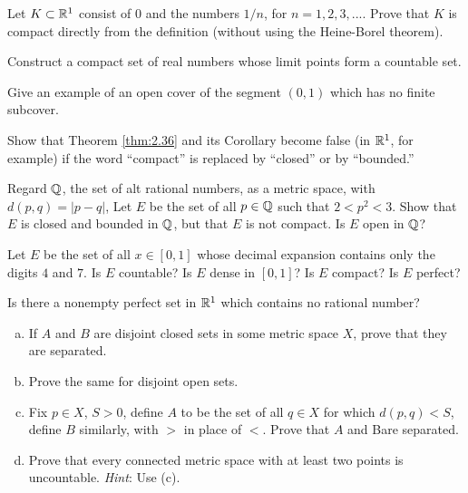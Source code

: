 \begin{myExercise}
    \label{ex:2.12}
    Let $K \subset {\protect\mathbb R}^1$ consist of $0$ and the numbers $1/n$, 
    for $n = 1, 2, 3, ...$. 
    Prove that $K$ is compact directly from the definition 
    (without using the Heine-Borel theorem).
\end{myExercise}

\begin{myExercise}
    \label{ex:2.13}
    Construct a compact set of real numbers whose limit points form a countable set.
\end{myExercise}

\begin{myExercise}
    \label{ex:2.14}
    Give an example of an open cover of the segment $(0, 1)$ 
    which has no finite subcover.
\end{myExercise}

\begin{myExercise}
    \label{ex:2.15}
    Show that Theorem \ref{thm:2.36} and its Corollary become false 
    (in ${\protect\mathbb R}^1$, for example) 
    if the word ``compact'' is replaced by ``closed'' or by ``bounded.''
\end{myExercise}

\begin{myExercise}
    \label{ex:2.16}
    Regard ${\protect\mathbb Q}$, the set of alt rational numbers, as a metric space, 
    with $d(p, q) = |p - q|$,
    Let $E$ be the set of all $p \in {\protect\mathbb Q}$ such that $2 < p^2 < 3$. 
    Show that $E$ is closed and bounded in ${\protect\mathbb Q}$, 
    but that $E$ is not compact. 
    Is $E$ open in ${\protect\mathbb Q}$?
\end{myExercise}

\begin{myExercise}
    \label{ex:2.17}
    Let $E$ be the set of all $x \in [0, 1]$ 
    whose decimal expansion contains only the digits $4$ and $7$. 
    Is $E$ countable? 
    Is $E$ dense in $[0, 1]$? 
    Is $E$ compact? 
    Is $E$ perfect?
\end{myExercise}

\begin{myExercise}
    \label{ex:2.18}
    Is there a nonempty perfect set in ${\protect\mathbb R}^1$ which contains no rational number?
\end{myExercise}


\begin{myExercise}
    \label{ex:2.19}
    \begin{enumerate}[(a)]
        \item If $A$ and $B$ are disjoint closed sets in some metric space $X$, prove that they are separated.
        \item Prove the same for disjoint open sets. 
        \item Fix $p \in X$, $S > 0$, define $A$ to be the set of all $q \in X$ for which $d(p, q) < S$, define $B$ similarly, with $>$ in place of $<$. Prove that $A$ and Bare separated.
        \item Prove that every connected metric space with at least two points is uncountable. \emph{Hint}: Use (c).
    \end{enumerate}
\end{myExercise}

